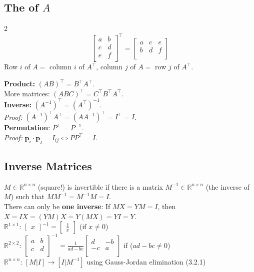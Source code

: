 \subsection{The  of $A$}
\begin{multicols}{2}
$$
\begin{bmatrix}
    a & b \\
    c & d \\
    e & f \\
\end{bmatrix}^\top
=
\begin{bmatrix}
    a & c & e\\
    b & d & f\\
\end{bmatrix}
$$
Row $i$ of $A =$ column $i$ of $A^\top$, column $j$ of $A =$ row $j$ of $A^\top$.
\end{multicols} 
\noindent\textbf{Product:} $(AB)^\top = B^\top A^\top$. \\
More matrices: $(ABC)^\top = C^\top B^\top A^\top$. \\[2.22mm]
\textbf{Inverse:} $(A^{-1})^\top = (A^\top)^{-1}$. \\
\textit{Proof:} $(A^{-1})^\top A^\top = (AA^{-1})^\top = I^\top = I$. \\[2.22mm]
\textbf{Permutation}: $P^\top = P^{-1}$. \\
\textit{Proof:} $\mathbf{p}_i \cdot \mathbf{p}_j = I_{ij} \Leftrightarrow PP^\top = I$.

\subsection{{Inverse Matrices}}
$M \in \mathbb{R}^{n \times n}$ (square!) is invertible if there is a matrix $M^{-1} \in \mathbb{R}^{n \times n}$ (the inverse of $M$) such
that $MM^{-1} = M^{-1}M = I$. \\
There can only be \textbf{one inverse}: If $MX = YM = I$, then $X = IX = (YM)X = Y(MX) = YI = Y$. \\[2.22mm]
$\mathbb{R}^{1 \times 1}$: $\begin{bmatrix}x\end{bmatrix}^{-1} = \begin{bmatrix}\frac{1}{x}\end{bmatrix}$ (if $x \not= 0$) \\
$\mathbb{R}^{2 \times 2}$: $
\begin{bmatrix}
    a & b \\
    c & d \\
\end{bmatrix}^{-1} = \displaystyle\frac{1}{ad-bc}
\begin{bmatrix}
    d & -b \\
    -c & a \\
\end{bmatrix}$ if ($ad-bc \not= 0$) \\
$\mathbb{R}^{n \times n}$: $[M|I]\rightarrow[I|M^{-1}]$ using Gauss-Jordan elimination (3.2.1)\\

